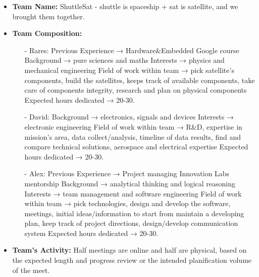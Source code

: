 \documentclass[11pt]{article}
\begin{document}
\begin{itemize}
\item \textbf{Team Name:} {ShuttleSat - shuttle is spaceship + sat is satellite, and we brought them together.}
\item \textbf{Team Composition:}
\begin{itemize}
\item[-] {Rares: Previous Experience → Hardware\&Embedded Google course \textbar\hspace{0cm} Background → pure sciences and maths \textbar\hspace{0cm} Interests → physics and mechanical engineering \textbar\hspace{0cm} Field of work within team → pick satellite's components, build the satellites, keeps track of available components, take care of components integrity, research and plan on physical components \textbar\hspace{0cm} Expected hours dedicated → 20-30.}
\item[-] {David: Background → electronics, signals and devices \textbar\hspace{0cm} Interests → electronic engineering \textbar\hspace{0cm} Field of work within team → R\&D, expertise in mission's area, data collect/analysis, timeline of data results, find and compare technical solutions, aerospace and electrical expertise \textbar\hspace{0cm} Expected hours dedicated → 20-30.}
\item[-] {Alex: Previous Experience → Project managing Innovation Labs mentorship \textbar\hspace{0cm} Background → analytical thinking and logical reasoning \textbar\hspace{0cm} Interests → team management and software engineering \textbar\hspace{0cm} Field of work within team → pick technologies, design and develop the software, meetings, initial ideas/information to start from maintain a developing plan, keep track of project directions, design/develop communication system \textbar\hspace{0cm} Expected hours dedicated → 20-30.}
\newline
\end{itemize}

\item \textbf{Team's Activity:} {Half meetings are online and half are physical, based on the expected length and progress review or the intended planification volume of the meet.}
\end{itemize}
\end{document}
